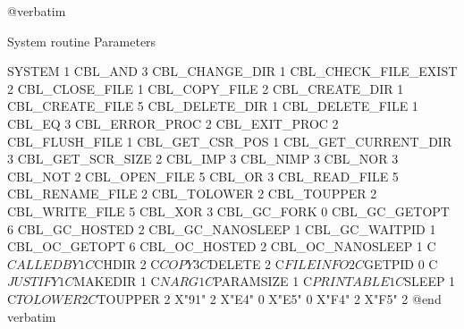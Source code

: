 @verbatim


System routine                  Parameters

SYSTEM                          1
CBL_AND                         3
CBL_CHANGE_DIR                  1
CBL_CHECK_FILE_EXIST            2
CBL_CLOSE_FILE                  1
CBL_COPY_FILE                   2
CBL_CREATE_DIR                  1
CBL_CREATE_FILE                 5
CBL_DELETE_DIR                  1
CBL_DELETE_FILE                 1
CBL_EQ                          3
CBL_ERROR_PROC                  2
CBL_EXIT_PROC                   2
CBL_FLUSH_FILE                  1
CBL_GET_CSR_POS                 1
CBL_GET_CURRENT_DIR             3
CBL_GET_SCR_SIZE                2
CBL_IMP                         3
CBL_NIMP                        3
CBL_NOR                         3
CBL_NOT                         2
CBL_OPEN_FILE                   5
CBL_OR                          3
CBL_READ_FILE                   5
CBL_RENAME_FILE                 2
CBL_TOLOWER                     2
CBL_TOUPPER                     2
CBL_WRITE_FILE                  5
CBL_XOR                         3
CBL_GC_FORK                     0
CBL_GC_GETOPT                   6
CBL_GC_HOSTED                   2
CBL_GC_NANOSLEEP                1
CBL_GC_WAITPID                  1
CBL_OC_GETOPT                   6
CBL_OC_HOSTED                   2
CBL_OC_NANOSLEEP                1
C$CALLEDBY                      1
C$CHDIR                         2
C$COPY                          3
C$DELETE                        2
C$FILEINFO                      2
C$GETPID                        0
C$JUSTIFY                       1
C$MAKEDIR                       1
C$NARG                          1
C$PARAMSIZE                     1
C$PRINTABLE                     1
C$SLEEP                         1
C$TOLOWER                       2
C$TOUPPER                       2
X"91"                           2
X"E4"                           0
X"E5"                           0
X"F4"                           2
X"F5"                           2
@end verbatim

